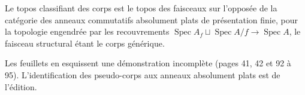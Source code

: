 \begin{encadre}
\begin{theoreme*}\nonverifie
Le topos classifiant des corps est le topos des faisceaux sur l'opposée de la catégorie des anneaux commutatifs absolument plats de présentation finie, pour la topologie engendrée par les recouvrements $\operatorname{Spec} A_f \sqcup \operatorname{Spec} A/f \to \operatorname{Spec} A$, le faisceau structural étant le corps générique.
\end{theoreme*}
\end{encadre}
{\small Les feuillets en esquissent une démonstration incomplète (pages 41, 42 et 92 à 95). L'identification des pseudo-corps aux anneaux absolument plats est de l'édition.\par}

